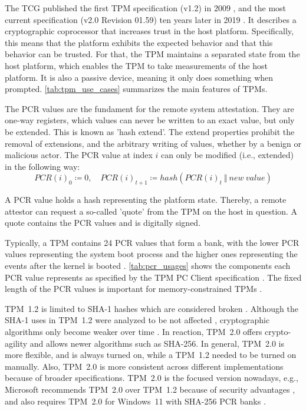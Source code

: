 The \ac{TCG} published the first TPM specification (v1.2) in 2009 \cite{ISO11889}, and the most current specification (v2.0 Revision 01.59) ten years later in 2019 \cite{tpm}.
It describes a cryptographic coprocessor that increases trust in the host platform. Specifically, this means that the platform exhibits the expected behavior and that this behavior can be trusted.
For that, the TPM maintains a separated state from the host platform, which enables the TPM to take measurements of the host platform.
It is also a passive device, meaning it only does something when prompted.
\autoref{tab:tpm_use_cases} summarizes the main features of TPMs.



The \ac{PCR} values are the fundament for the remote system attestation. They are one-way registers, which values can never be written to an exact value, but only be extended.
This is known as 'hash extend'.
The extend properties prohibit the removal of extensions, and the arbitrary writing of values, whether by a benign or malicious actor.
The PCR value at index $i$ can only be modified (i.e., extended) in the following way:
\[ PCR(i)_0 \coloneqq 0,\quad PCR(i)_{t+1} \coloneqq hash(PCR(i)_t\ \Vert\ new\ value)\]

A PCR value holds a hash representing the platform state.
Thereby, a remote attestor can request a so-called 'quote' from the TPM on the host in question.
A quote contains the PCR values and is digitally signed.

Typically, a TPM contains 24 PCR values that form a bank, with the lower PCR values representing the system boot process and the higher ones representing the events after the kernel is booted \cite{Arthur2015}. \autoref{tab:pcr_usages} shows the components each PCR value represents as specified by the TPM PC Client specification \cite{tcgPcClient}. The fixed length of the \ac{PCR} values is important for memory-constrained TPMs \cite{Arthur2015}.




TPM~1.2 is limited to SHA-1 hashes which are considered broken \cite{cryptoeprint:2005/010, Wang2005, Stevens2017}. Although the SHA-1 uses in TPM~1.2 were analyzed to be not affected \cite{sha1tpm12}, cryptographic algorithms only become weaker over time \cite{Arthur2015}. In reaction, TPM~2.0 offers crypto-agility and allows newer algorithms such as SHA-256. In general, TPM~2.0 is more flexible, and is always turned on, while a TPM~1.2 needed to be turned on manually. Also, TPM~2.0 is more consistent across different implementations because of broader specifications.
TPM~2.0 is the focused version nowadays, e.g., Microsoft recommends TPM~2.0 over TPM~1.2 because of security advantages \cite{micrec}, and also requires TPM~2.0 for Windows~11 with SHA-256 PCR banks \cite{win11req}.

